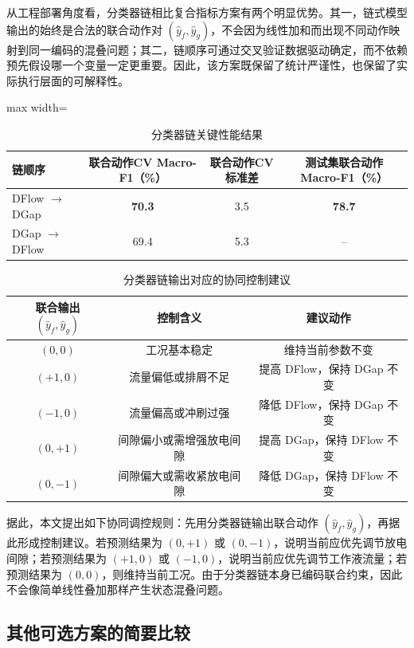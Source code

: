 \documentclass[UTF8,a4paper,12pt]{ctexart}
\begin{document}
从工程部署角度看，分类器链相比复合指标方案有两个明显优势。其一，链式模型输出的始终是合法的联合动作对 $(\hat y_f,\hat y_g)$，不会因为线性加和而出现不同动作映射到同一编码的混叠问题；其二，链顺序可通过交叉验证数据驱动确定，而不依赖预先假设哪一个变量一定更重要。因此，该方案既保留了统计严谨性，也保留了实际执行层面的可解释性。

\begin{table}[H]
\centering
\caption{分类器链关键性能结果}
\label{tab:chain}
\begin{adjustbox}{max width=\textwidth}
\begin{tabular}{lccc}
\toprule
链顺序 & 联合动作CV Macro-F1（\%） & 联合动作CV标准差 & 测试集联合动作Macro-F1（\%） \\
\midrule
DFlow $\rightarrow$ DGap & \textbf{70.3} & 3.5 & \textbf{78.7} \\
DGap $\rightarrow$ DFlow & 69.4 & 5.3 & -- \\
\bottomrule
\end{tabular}
\end{adjustbox}
\end{table}

\begin{table}[H]
\centering
\caption{分类器链输出对应的协同控制建议}
\label{tab:control_rule}
\begin{tabular}{ccc}
\toprule
联合输出 $(\hat y_f,\hat y_g)$ & 控制含义 & 建议动作 \\
\midrule
$(0,0)$ & 工况基本稳定 & 维持当前参数不变 \\
$(+1,0)$ & 流量偏低或排屑不足 & 提高 DFlow，保持 DGap 不变 \\
$(-1,0)$ & 流量偏高或冲刷过强 & 降低 DFlow，保持 DGap 不变 \\
$(0,+1)$ & 间隙偏小或需增强放电间隙 & 提高 DGap，保持 DFlow 不变 \\
$(0,-1)$ & 间隙偏大或需收紧放电间隙 & 降低 DGap，保持 DFlow 不变 \\
\bottomrule
\end{tabular}
\end{table}

据此，本文提出如下协同调控规则：先用分类器链输出联合动作 $(\hat y_f,\hat y_g)$，再据此形成控制建议。若预测结果为 $(0,+1)$ 或 $(0,-1)$，说明当前应优先调节放电间隙；若预测结果为 $(+1,0)$ 或 $(-1,0)$，说明当前应优先调节工作液流量；若预测结果为 $(0,0)$，则维持当前工况。由于分类器链本身已编码联合约束，因此不会像简单线性叠加那样产生状态混叠问题。

\subsection{其他可选方案的简要比较}
\end{document}
